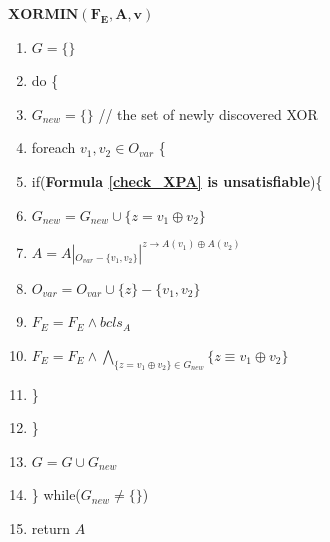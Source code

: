 \documentclass[journal]{IEEEtran}
\begin{document}
\begin{algo}\label{buildfdec}
\textbf{ $\boldsymbol{XORMIN(F_E, A,v)}$}
\begin{enumerate}%
\item $G=\{\}$
\item do \{

\item \hspace{0.3cm} $G_{new}=\{\}$  // the set of newly discovered XOR
\item \hspace{0.3cm} foreach $v_1,v_2\in O_{var}$ \{

\item \hspace{0.6cm}   if(\textbf{Formula \ref{check_XPA} is unsatisfiable})\{

\item \hspace{0.9cm}     $G_{new}= G_{new}\cup \{ z= v_1\oplus v_2\}$
\item \hspace{0.9cm}     $A= A|_{O_{var}-\{v_1,v_2\}}|^{z\to A(v_1)\oplus A(v_2)}$
\item \hspace{0.9cm}     $O_{var}= O_{var}\cup \{z\}-\{v_1,v_2\}$
\item \hspace{0.9cm}     $F_E= F_E\wedge bcls_{A}$
\item \hspace{0.9cm}     $F_E= F_E\wedge \bigwedge _{\{z= v_1\oplus v_2\}\in G_{new}}\big\{z\equiv v_1\oplus v_2\big\}$

\item \hspace{0.6cm}   \}
\item \hspace{0.3cm} \}
\item \hspace{0.3cm} $G=G\cup G_{new}$
\item \} while($G_{new}\ne \{\}$)
\item return $A$
\end{enumerate}
\end{algo}

\vspace{0.2cm}
\end{document}
